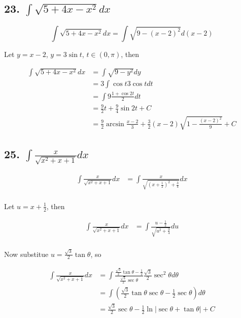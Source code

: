 \documentclass{article}
\begin{document}
    \subsection*{23. $\int \sqrt{5 + 4x - x^2} dx $}

    $$\int \sqrt{5 + 4x - x^2} dx = \int \sqrt{9 -(x -2)^2} d(x - 2)$$

    Let $y = x - 2$, $y = 3 \sin t$, $t \in (0, \pi)$, then 

    $$\begin{aligned}
        \int \sqrt{5 + 4x - x^2} dx &= \int \sqrt{9 - y^2} dy \\
        &= 3\int \cos t 3 \cos t dt \\
        &= \int 9\frac{1 + \cos 2t}{2} dt \\
        &= \frac 9 2t + \frac 9 4 \sin 2t + C \\
        &= \frac 9 2 \arcsin \frac{x - 2}{3} + \frac 3 2(x - 2)\sqrt{1 - \frac{(x - 2)^2}{9}} + C
    \end{aligned}$$

    \subsection*{25. $\int \frac{x}{\sqrt{x^2 + x + 1}}dx $}

    $$\begin{aligned}
        \int \frac{x}{\sqrt{x^2 + x + 1}}dx &= \int \frac{x}{\sqrt{(x + \frac 1 2)^2 + \frac 3 4}} dx \\
    \end{aligned}$$

    Let $u = x + \frac 1 2$, then

    $$\begin{aligned}
        \int \frac{x}{\sqrt{x^2 + x + 1}}dx &= \int \frac{u - \frac 1 2}{\sqrt{u^2 + \frac 3 4}}du \\
    \end{aligned}$$

    Now substitue $u = \frac{\sqrt 3}{2} \tan \theta$, so

    $$\begin{aligned}
        \int \frac{x}{\sqrt{x^2 + x + 1}} dx &= \int \frac{\frac{\sqrt 3}{2}\tan \theta - \frac 1 2}{\frac{\sqrt 3}{2} \sec \theta}\frac{\sqrt 3}{2}\sec^2 \theta d\theta \\
        &= \int (\frac{\sqrt 3}{2} \tan\theta \sec \theta - \frac 1 2 \sec \theta) d\theta \\
        &= \frac{\sqrt{3}}{2}\sec \theta - \frac 1 2 \ln|\sec \theta + \tan \theta| + C
    \end{aligned}$$
\end{document}
